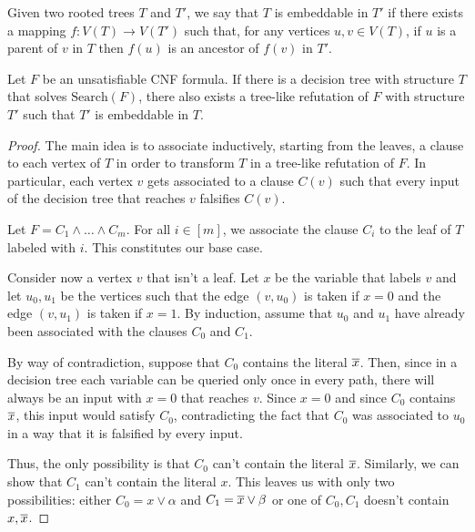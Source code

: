 \begin{definition}
Given two rooted trees $T$ and $T'$, we say that $T$ is embeddable in $T'$ if there exists a mapping $f : V(T) \to V(T')$ such that, for any vertices $u,v \in V(T)$, if $u$ is a parent of $v$ in $T$ then $f(u)$ is an ancestor of $f(v)$ in $T'$.
\end{definition}

\begin{lemma} \label{lem:dt_treeres}
    \cite{treelike_res_size,search_problems_dt_model}
    Let $F$ be an unsatisfiable CNF formula. If there is a decision tree with structure $T$ that solves $\mathrm{Search}(F)$, there also exists a tree-like refutation of $F$ with structure $T'$ such that $T'$ is embeddable in $T$.
\end{lemma}

\begin{proof}

    The main idea is to associate inductively, starting from the leaves, a clause to each vertex of $T$ in order to transform $T$ in a tree-like refutation of $F$. In particular, each vertex $v$ gets associated to a clause $C(v)$ such that every input of the decision tree that reaches $v$ falsifies $C(v)$.

    Let $F = C_1 \land \ldots \land C_m$. For all $i \in [m]$, we associate the clause $C_i$ to the leaf of $T$ labeled with $i$. This constitutes our base case.

    Consider now a vertex $v$ that isn't a leaf. Let $x$ be the variable that labels $v$ and let $u_0, u_1$ be the vertices such that the edge $(v, u_0)$ is taken if $x = 0$ and the edge $(v, u_1)$ is taken if $x = 1$.  By induction, assume that $u_0$ and $u_1$ have already been associated with the clauses $C_0$ and $C_1$.

    By way of contradiction, suppose that $C_0$ contains the literal $\overline{x}$. Then, since in a decision tree each variable can be queried only once in every path, there will always be an input with $x = 0$ that reaches $v$. Since $x = 0$ and since $C_0$ contains $\overline{x}$, this input would satisfy $C_0$, contradicting the fact that $C_0$ was associated to $u_0$ in a way that it is falsified by every input.

    Thus, the only possibility is that $C_0$ can't contain the literal $\overline{x}$. Similarly, we can show that $C_1$ can't contain the literal $x$. This leaves us with only two possibilities: either $C_0 = x \lor \alpha$ and $C_1 = \overline{x} \lor \beta$ or one of $C_0, C_1$ doesn't contain $x, \overline{x}$.


\end{proof}
